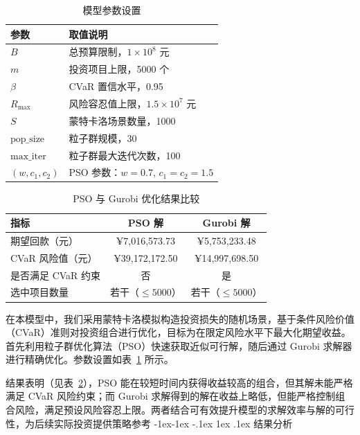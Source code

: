 \documentclass[12pt,nonblindrev]{write_paper}
\makeatletter
\renewcommand\subsection{\@startsection{subsection}{2}{\z@}%
                                     {-1ex\@plus -1ex \@minus -.1ex}%
                                     {1ex \@plus .1ex}%
                                     {\normalfont \normalsize \bfseries}}
\makeatother
\begin{document}
\begin{table}[htbp]
\centering
\caption{模型参数设置}
\begin{tabular}{ll}
\toprule
\textbf{参数} & \textbf{取值说明} \\
\midrule
$B$ & 总预算限制，$1\times10^8$ 元 \\
$m$ & 投资项目上限，5000 个 \\
$\beta$ & CVaR 置信水平，0.95 \\
$R_{\max}$ & 风险容忍值上限，$1.5\times10^7$ 元 \\
$S$ & 蒙特卡洛场景数量，1000 \\
$\text{pop\_size}$ & 粒子群规模，30 \\
$\text{max\_iter}$ & 粒子群最大迭代次数，100 \\
$(w, c_1, c_2)$ & PSO 参数：$w=0.7$, $c_1=c_2=1.5$ \\
\bottomrule
\end{tabular}
\label{tab:params}
\end{table}
\begin{table}[htbp]
\centering
\caption{PSO 与 Gurobi 优化结果比较}
\begin{tabular}{lcc}
\toprule
\textbf{指标} & \textbf{PSO 解} & \textbf{Gurobi 解} \\
\midrule
期望回款（元） & ¥7,016,573.73 & ¥5,753,233.48 \\
CVaR 风险值（元） & ¥39,172,172.50 & ¥14,997,698.50 \\
是否满足 CVaR 约束 & 否 & 是 \\
选中项目数量 & 若干（$\leq 5000$） & 若干（$\leq 5000$） \\
\bottomrule
\end{tabular}
\label{tab:results}
\end{table}
在本模型中，我们采用蒙特卡洛模拟构造投资损失的随机场景，基于条件风险价值（CVaR）准则对投资组合进行优化，目标为在限定风险水平下最大化期望收益。首先利用粒子群优化算法（PSO）快速获取近似可行解，随后通过 Gurobi 求解器进行精确优化。参数设置如表~\ref{tab:params} 所示。

结果表明（见表~\ref{tab:results}），PSO 能在较短时间内获得收益较高的组合，但其解未能严格满足 CVaR 风险约束；而 Gurobi 求解得到的解在收益上略低，但能严格控制组合风险，满足预设风险容忍上限。两者结合可有效提升模型的求解效率与解的可行性，为后续实际投资提供策略参考
\subsection{结果分析}
\label{subsec:result_analysis}
\end{document}
